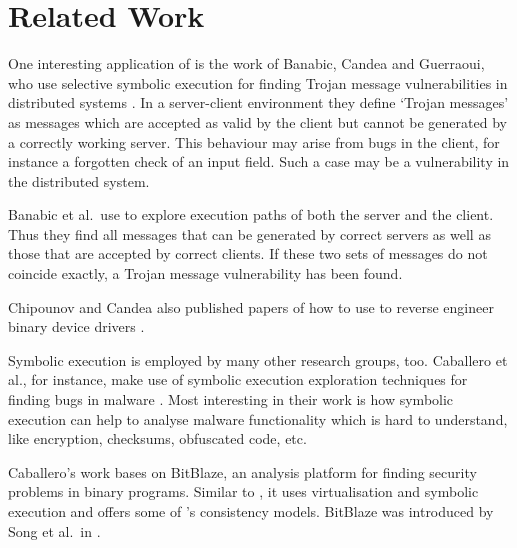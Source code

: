\section{Related Work}\label{sec:rel_work}

One interesting application of \sse is the work of Banabic, Candea and Guerraoui, who use selective symbolic execution for finding Trojan message vulnerabilities in distributed systems \cite{trojan14}.
In a server-client environment they define `Trojan messages' as messages which are accepted as valid by the client but cannot be generated by a correctly working server.
This behaviour may arise from bugs in the client, for instance a forgotten check of an input field.
Such a case may be a vulnerability in the distributed system.

Banabic et al.~use \sse to explore execution paths of both the server and the client.
Thus they find all messages that can be generated by correct servers as well as those that are accepted by correct clients.
If these two sets of messages do not coincide exactly, a Trojan message vulnerability has been found.

\medskip
Chipounov and Candea also published papers of how to use \sse to reverse engineer binary device drivers \cite{chipounov2010reverse, chipounov2011enabling}.


\medskip
Symbolic execution is employed by many other research groups, too.
Caballero et al., for instance, make use of symbolic execution exploration techniques for finding bugs in malware \cite{caballero2010input}.
Most interesting in their work is how symbolic execution can help to analyse malware functionality which is hard to understand, like encryption, checksums, obfuscated code, etc.


\medskip
Caballero's work bases on BitBlaze, an analysis platform for finding security problems in binary programs.
Similar to \sse, it uses virtualisation and symbolic execution and offers some of \sse's consistency models.
BitBlaze was introduced by Song et al.~in \cite{song2008bitblaze}.

\iffalse
§8	Related Work
		> Was haben andere mit S2E in ähnlicher Richtung gemacht?
		> Z.B. "Finding Trojan Message Vulnerabilities in Distributed Systems”
\fi